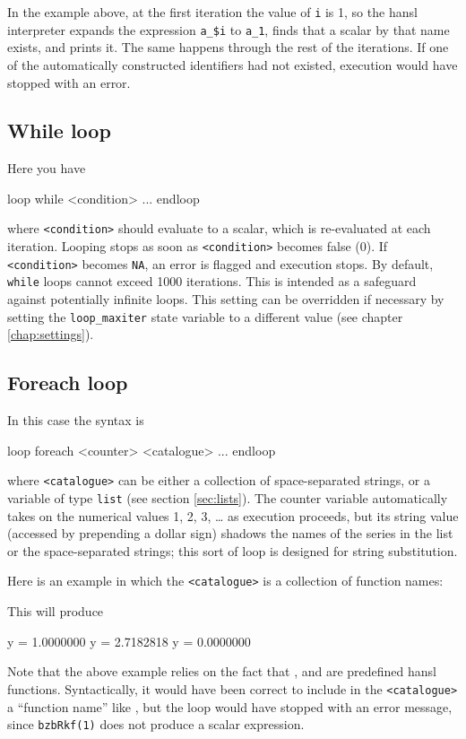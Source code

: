 In the example above, at the first iteration the value of \texttt{i}
is 1, so the hansl interpreter expands the expression \verb|a_$i| to
\verb|a_1|, finds that a scalar by that name exists, and prints
it. The same happens through the rest of the iterations. If one of the
automatically constructed identifiers had not existed, execution would
have stopped with an error.

\subsection{While loop}

Here you have
\begin{code}
loop while <condition>
   ...
endloop
\end{code}
where \texttt{<condition>} should evaluate to a scalar, which is
re-evaluated at each iteration. Looping stops as soon as
\texttt{<condition>} becomes false (0). If \texttt{<condition>}
becomes \texttt{NA}, an error is flagged and execution stops.  By
default, \texttt{while} loops cannot exceed 1000 iterations. This is
intended as a safeguard against potentially infinite loops. This
setting can be overridden if necessary by setting the
\texttt{loop\_maxiter} state variable to a different value (see
chapter \ref{chap:settings}).

\subsection{Foreach loop}
\label{sec:loop-foreach}

In this case the syntax is
\begin{code}
loop foreach <counter> <catalogue>
   ...
endloop
\end{code}
where \texttt{<catalogue>} can be either a collection of
space-separated strings, or a variable of type \texttt{list} (see
section \ref{sec:lists}). The counter variable automatically takes on
the numerical values 1, 2, 3, \dots{} as execution proceeds, but its
string value (accessed by prepending a dollar sign) shadows the names
of the series in the list or the space-separated strings; this sort of
loop is designed for string substitution.

Here is an example in which the \texttt{<catalogue>} is a collection
of function names: 
This will produce
\begin{code}
              y =  1.0000000
              y =  2.7182818
              y =  0.0000000
\end{code}
Note that the above example relies on the fact that ,
 and  are predefined hansl functions. Syntactically,
it would have been correct to include in the \texttt{<catalogue>} a
``function name'' like , but the loop would have stopped
with an error message, since \texttt{bzbRkf(1)} does not produce a
scalar expression.

